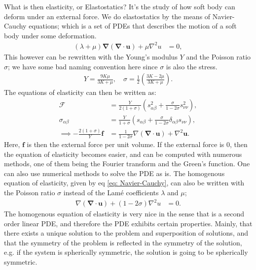 \documentclass[a4paper]{article}
\newcommand{\dive}[1]{\mathbf{\nabla}\cdot \mathbf{#1}}
\newcommand{\laplace}{\nabla^2}
\newcommand{\f}{\mathcal{F}}
\begin{document}
\vspace*{0.5cm}\noindent
What is then elasticity, or Elastostatics? It's the study of how soft body can deform under an external force.
We do elastostatics by the means of Navier-Cauchy equations; which is a set of PDEs that describes the motion of a soft body under some deformation.
\begin{align}
    \left(\lambda + \mu\right)\mathbf{\nabla}\left(\dive{u}\right)+\mu\laplace{u} &=0, \label{eq: Navier-Cauchy}
\end{align}This however can be rewritten with the Young's modulus $Y$ and the Poisson ratio $\sigma$; we have some bad naming convention here since $\sigma$ is also the stress.
\begin{align*}
    Y = \frac{9K\mu}{3K + \mu}, \quad \sigma = \frac{1}{2}\left(\frac{3K - 2\mu}{3K + \mu}\right).
\end{align*}The equations of elasticity can then be written as:
\begin{align*}
    \f &= \frac{Y}{2(1 + \sigma)}\left(s_{\alpha\beta}^2+ \frac{\sigma}{1-2\sigma}s_{\nu\nu}^2\right),\\
    \sigma_{\alpha\beta}&= \frac{Y}{1+\sigma}\left(s_{\alpha\beta} + \frac{\sigma}{1-2\sigma}\delta_{\alpha\beta}s_{\nu\nu}\right),\\
    \implies -\frac{2(1+\sigma)}{Y}\mathbf{f} &= \frac{1}{1-2\sigma}\nabla\left(\dive{u}\right) + \nabla^2\mathbf{u}.
\end{align*}Here, $\mathbf{f}$ is then the external force per unit volume. If the external force is $0$, then the equation of elasticity becomes easier, and can be computed with numerous methods, one of them being the Fourier transform and the Green's function.
One can also use numerical methods to solve the PDE as is. The homogenous equation of elasticity, given by eq \eqref{eq: Navier-Cauchy}, can also be written with the Poisson ratio $\sigma$ instead of the Lamé coefficients $\lambda$ and $\mu$;
\begin{align}
    \nabla\left(\dive{u}\right)+(1-2\sigma)\laplace{u} &= 0. \label{eq: Hom Navier-Cauchy Poisson}
\end{align}The homogenous equation of elasticity is very nice in the sense that is a second order linear PDE, and therefore the PDE exhibits certain properties.
Mainly, that there exists a unique solution to the problem and superposition of solutions, and that the symmetry of the problem is reflected in the symmetry of the solution, e.g. if the system is spherically symmetric, the solution is going to be spherically symmetric.
\end{document}
